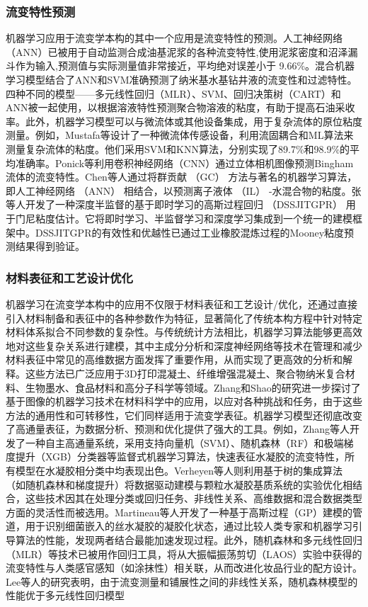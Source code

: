 \subsubsection{流变特性预测}
机器学习应用于流变学本构的其中一个应用是流变特性的预测。人工神经网络（ANN）已被用于自动监测合成油基泥浆的各种流变特性,使用泥浆密度和沼泽漏斗作为输入,预测值与实际测量值非常接近，平均绝对误差小于 9.66\%。混合机器学习模型结合了ANN和SVM准确预测了纳米基水基钻井液的流变性和过滤特性。四种不同的模型——多元线性回归（MLR）、SVM、回归决策树（CART）和ANN被一起使用，以根据溶液特性预测聚合物溶液的粘度，有助于提高石油采收率。此外，机器学习模型可以与微流体或其他设备集成，用于复杂流体的原位粘度测量。例如，Mustafa等设计了一种微流体传感设备，利用流固耦合和ML算法来测量复杂流体的粘度。他们采用SVM和KNN算法，分别实现了89.7\%和98.9\%的平均准确率。Ponick等利用卷积神经网络（CNN）通过立体相机图像预测Bingham流体的流变特性。Chen等人通过将群贡献 （GC） 方法与著名的机器学习算法，即人工神经网络 （ANN） 相结合，以预测离子液体 （IL） -水混合物的粘度。张等人开发了一种深度半监督的基于即时学习的高斯过程回归 （DSSJITGPR） 用于门尼粘度估计。它将即时学习、半监督学习和深度学习集成到一个统一的建模框架中。DSSJITGPR的有效性和优越性已通过工业橡胶混炼过程的Mooney粘度预测结果得到验证。

\subsubsection{材料表征和工艺设计优化}
机器学习在流变学本构中的应用不仅限于材料表征和工艺设计/优化，还通过直接引入材料制备和表征中的各种参数作为特征，显著简化了传统本构方程中针对特定材料体系拟合不同参数的复杂性。与传统统计方法相比，机器学习算法能够更高效地对这些复杂关系进行建模，其中主成分分析和深度神经网络等技术在管理和减少材料表征中常见的高维数据方面发挥了重要作用，从而实现了更高效的分析和解释。这些方法已广泛应用于3D打印混凝土、纤维增强混凝土、聚合物纳米复合材料、生物墨水、食品材料和高分子科学等领域。Zhang和Shao的研究进一步探讨了基于图像的机器学习技术在材料科学中的应用，以应对各种挑战和任务，由于这些方法的通用性和可转移性，它们同样适用于流变学表征。机器学习模型还彻底改变了高通量表征，为数据分析、预测和优化提供了强大的工具。例如，Zhang等人开发了一种自主高通量系统，采用支持向量机（SVM）、随机森林（RF）和极端梯度提升（XGB）分类器等监督式机器学习算法，快速表征水凝胶的流变特性，所有模型在水凝胶相分类中均表现出色。Verheyen等人则利用基于树的集成算法（如随机森林和梯度提升）将数据驱动建模与颗粒水凝胶基质系统的实验优化相结合，这些技术因其在处理分类或回归任务、非线性关系、高维数据和混合数据类型方面的灵活性而被选用。Martineau等人开发了一种基于高斯过程（GP）建模的管道，用于识别细菌嵌入的丝水凝胶的凝胶化状态，通过比较人类专家和机器学习引导算法的性能，发现两者结合最能加速发现过程。此外，随机森林和多元线性回归（MLR）等技术已被用作回归工具，将从大振幅振荡剪切（LAOS）实验中获得的流变特性与人类感官感知（如涂抹性）相关联，从而改进化妆品行业的配方设计。Lee等人的研究表明，由于流变测量和铺展性之间的非线性关系，随机森林模型的性能优于多元线性回归模型

